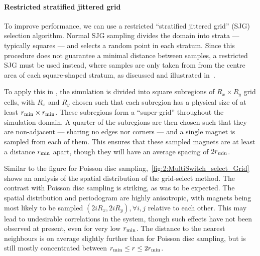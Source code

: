 \paragraph{Restricted stratified jittered grid}
To improve performance, we can use a restricted ``stratified jittered grid'' (SJG) selection algorithm.
Normal SJG sampling divides the domain into strata --- typically squares --- and selects a random point in each stratum.
Since this procedure does not guarantee a minimal distance between samples, a restricted SJG must be used instead, where samples are only taken from from the centre area of each square-shaped stratum, as discussed and illustrated in~. \par %
To apply this in \hotspice, the simulation is divided into square subregions of $R_x \times R_y$ grid cells, with $R_x$ and $R_y$ chosen such that each subregion has a physical size of at least $r_\mathrm{min} \times r_\mathrm{min}$.
These subregions form a ``super-grid'' throughout the simulation domain.
A quarter of the subregions are then chosen such that they are non-adjacent --- sharing no edges nor corners --- and a single magnet is sampled from each of them.
This ensures that these sampled magnets are at least a distance $r_\mathrm{min}$ apart, though they will have an average spacing of $2r_\mathrm{min}$. \\\par

Similar to the figure for Poisson disc sampling,~\cref{fig:2:MultiSwitch_select_Grid} shows an analysis of the spatial distribution of the grid-select method.
The contrast with Poisson disc sampling is striking, as was to be expected.
The spatial distribution and periodogram are highly anisotropic, with magnets being most likely to be sampled $(2iR_x, 2iR_y), \forall i,j$ relative to each other.
This may lead to undesirable correlations in the system, though such effects have not been observed at present, even for very low $r_\mathrm{min}$.
The distance to the nearest neighbours is on average slightly further than for Poisson disc sampling, but is still mostly concentrated between $r_\mathrm{min} \leq r \leq 2r_\mathrm{min}$.


